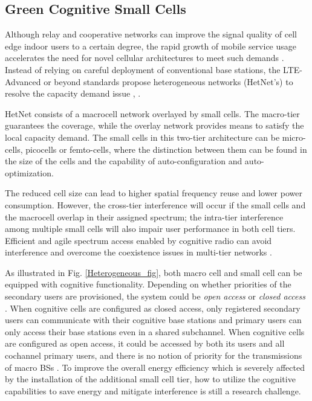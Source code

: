 \documentclass[journal,12pt,onecolumn]{IEEEtran}
\begin{document}
\subsection{Green Cognitive Small Cells}
Although relay and cooperative networks can improve the signal quality of cell edge indoor users to a certain degree, the rapid growth of mobile service usage accelerates the need for novel cellular architectures to meet such demands \cite{HET}. Instead of relying on careful deployment of conventional base stations, the LTE-Advanced or beyond standards propose heterogeneous networks (HetNet's) to resolve the capacity demand issue \cite{Het1}, \cite{Het2}.

HetNet consists of a macrocell network overlayed by small cells. The macro-tier guarantees the coverage, while the overlay network provides means to satisfy the local capacity demand. The small cells in this two-tier architecture can be micro-cells, picocells or femto-cells, where the distinction between them can be found in the size of the cells and the capability of auto-configuration and auto-optimization. 

The reduced cell size can lead to higher spatial frequency reuse and lower power consumption. However, the cross-tier interference will occur if the small cells and the macrocell overlap in their assigned spectrum; the intra-tier interference among multiple small cells will also impair user performance in both cell tiers. Efficient and agile spectrum access enabled by cognitive radio can avoid interference and overcome the coexistence issues in multi-tier networks \cite{coghet}.

As illustrated in Fig. \ref{Heterogeneous_fig}, both macro cell and small cell can be equipped with cognitive functionality. Depending on whether priorities of the secondary users are provisioned, the system could be \emph{open access} or \emph{closed access} \cite{6171997}. When cognitive cells are configured as closed access, only registered secondary users can communicate with their cognitive base stations and primary users can only access their base stations even in a shared subchannel. When cognitive cells are configured as open access, it could be accessed by both its users and all cochannel primary users, and there is no notion of priority for the transmissions of macro BSs \cite{coghet}. To improve the overall energy efficiency which is severely affected by the installation of the additional small cell tier, how to utilize the cognitive capabilities to save energy and mitigate interference is still a research challenge.
\end{document}
